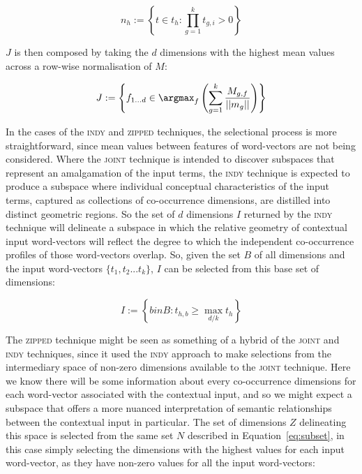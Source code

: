 \begin{equation} \label{eq:subset}
n_h := \left \{t \in t_h: \prod_{g=1}^{k} t_{g,i} > 0\right \}
\end{equation}

\noindent $J$ is then composed by taking the $d$ dimensions with the highest mean values across a row-wise normalisation of $M$:

\begin{equation}
J := \left \{ f_{1...d} \in \argmax_{f}\left(\sum_{g=1}^{k} \frac{M_{g,f}}{||m_g||}\right)\right \}
\end{equation}

\noindent In the cases of the \textsc{indy} and \textsc{zipped} techniques, the selectional process is more straightforward, since mean values between features of word-vectors are not being considered.  Where the \textsc{joint} technique is intended to discover subspaces that represent an amalgamation of the input terms, the \textsc{indy} technique is expected to produce a subspace where individual conceptual characteristics of the input terms, captured as collections of co-occurrence dimensions, are distilled into distinct geometric regions.  So the set of $d$ dimensions $I$ returned by the \textsc{indy} technique will delineate a subspace in which the relative geometry of contextual input word-vectors will reflect the degree to which the independent co-occurrence profiles of those word-vectors overlap.  So, given the set $B$ of all dimensions and the input word-vectors $\{t_1, t_2... t_k\}$, $I$ can be selected from this base set of dimensions:

\begin{equation}
I := \left \{b in B: t_{h,b} \geq \max_{d/k} t_h \right \}
\end{equation}

\noindent The \textsc{zipped} technique might be seen as something of a hybrid of the \textsc{joint} and \textsc{indy} techniques, since it used the \textsc{indy} approach to make selections from the intermediary space of non-zero dimensions available to the \textsc{joint} technique.  Here we know there will be some information about every co-occurrence dimensions for each word-vector associated with the contextual input, and so we might expect a subspace that offers a more nuanced interpretation of semantic relationships between the contextual input in particular.  The set of dimensions $Z$ delineating this space is selected from the same set $N$ described in Equation~\ref{eq:subset}, in this case simply selecting the dimensions with the highest values for each input word-vector, as they have non-zero values for all the input word-vectors:

